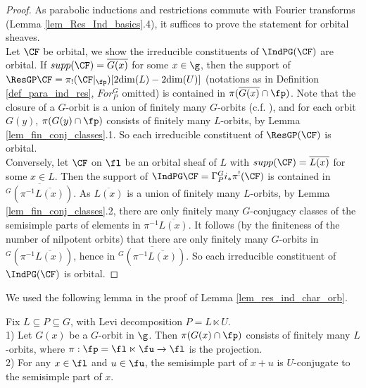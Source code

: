 \begin{proof}
    As parabolic inductions and restrictions commute with Fourier transforms (Lemma \ref{lem_Res_Ind_basics}.4), it suffices to prove the statement for orbital sheaves.\\
    
    Let $\CF$ be orbital, we show the irreducible constituents of $\IndPG(\CF)$ are orbital. If $supp(\CF)=\overline{G(x)}$ for some $x\in\g$, then the support of $\ResGP\CF=\pi_!(\CF|_\fp)[2\mathrm{dim}(L)-2\mathrm{dim}(U)]$ (notations as in Definition \ref{def_para_ind_res}, $For^G_P$ omitted) is contained in $\pi(\overline{G(x)}\cap \fp)$. Note that the closure of a $G$-orbit is a union of finitely many $G$-orbits (c.f. \cite[proof of 8.4]{jantzen_nilpotent_2004}), and for each orbit $G(y)$, $\pi(G(y)\cap \fp)$ consists of finitely many $L$-orbits, by Lemma \ref{lem_fin_conj_classes}.1. So each irreducible constituent of $\ResGP(\CF)$ is orbital.\\

    Conversely, let $\CF$ on $\fl$ be an orbital sheaf of $L$ with $supp(\CF)=\overline{L(x)}$ for some $x\in L$. Then the support of $\IndPG\CF=\Gamma^G_Pi_*\pi^!(\CF)$ is contained in $\overline{^G(\pi^{-1}\overline{L(x)})}$. As $\overline{L(x)}$ is a union of finitely many $L$-orbits, by Lemma \ref{lem_fin_conj_classes}.2, there are only finitely many $G$-conjugacy classes of the semisimple parts of elements in $\pi^{-1}\overline{L(x)}$. It follows (by the finiteness of the number of nilpotent orbits) that there are only finitely many $G$-orbits in $^G(\pi^{-1}\overline{L(x)})$, hence in $\overline{^G(\pi^{-1}\overline{L(x)})}$. So each irreducible constituent of $\IndPG(\CF)$ is orbital.

\end{proof}

We used the following lemma in the proof of Lemma \ref{lem_res_ind_char_orb}.

\begin{lemma}\label{lem_fin_conj_classes}
    Fix $L\subseteq P\subseteq G$, with Levi decomposition $P=L\ltimes U$.\\ 
    1) Let $G(x)$ be a $G$-orbit in $\g$. Then $\pi(G(x)\cap \fp)$ consists of finitely many $L$-orbits, where $\pi: \fp=\fl\ltimes\fu\rightarrow\fl$ is the projection.\\
    2) For any $x\in \fl$ and $u\in \fu$, the semisimple part of $x+u$ is $U$-conjugate to the semisimple part of $x$.
\end{lemma}

